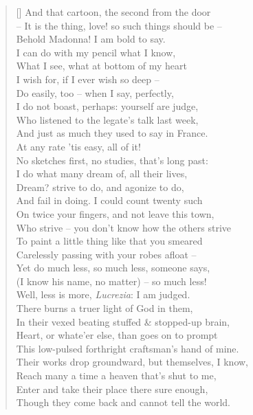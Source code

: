 \documentclass[MAIN]{subfiles}
\begin{document}
\begin{verse}[\versewidth]
And that cartoon, the second from the door\\ 
-- It is the thing, love! so such things should be --\\
Behold Madonna! I am bold to say.\\
I can do with my pencil what I know,\\
What I see, what at bottom of my heart\\
I wish for, if I ever wish so deep --\\
Do easily, too -- when I say, perfectly,\\
I do not boast, perhaps: yourself are judge,\\
Who listened to the legate's talk last week,\\
And just as much they used to say in France.\\
At any rate 'tis easy, all of it!\\
No sketches first, no studies, that's long past:\\
I do what many dream of, all their lives,\\
Dream? strive to do, and agonize to do,\\
And fail in doing. I could count twenty such\\
On twice your fingers, and not leave this town,\\
Who strive -- you don't know how the others strive\\ 
To paint a little thing like that you smeared\\
Carelessly passing with your robes afloat --\\
Yet do much less, so much less, someone says,\\
(I know his name, no matter) -- so much less!\\
Well, less is more, \emph{Lucrezia}: I am judged.\\
There burns a truer light of God in them,\\
In their vexed beating stuffed \& stopped-up brain,\\
Heart, or whate'er else, than goes on to prompt\\
This low-pulsed forthright craftsman's hand of mine.\\
Their works drop groundward, but themselves, I know,\\
Reach many a time a heaven that's shut to me,\\
Enter and take their place there sure enough,\\
Though they come back and cannot tell the world.\\

\end{verse}
\end{document}

